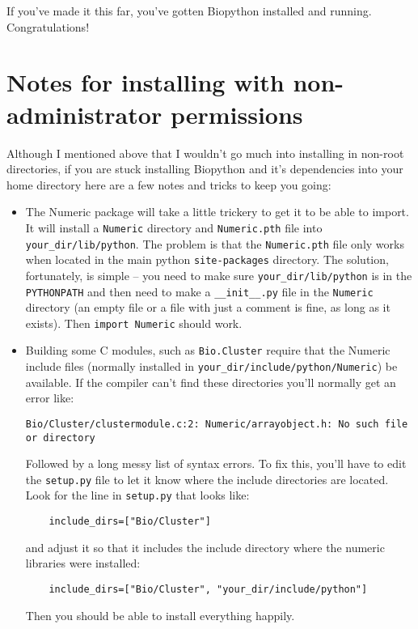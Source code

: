\documentclass{article}
\begin{document}
If you've made it this far, you've gotten Biopython installed and running.
Congratulations!

\section{Notes for installing with non-administrator permissions}

Although I mentioned above that I wouldn't go much into installing in
non-root directories, if you are stuck installing
Biopython and it's dependencies into your home directory here are a
few notes and tricks to keep you going:

\begin{itemize}
  \item The Numeric package will take a little trickery to get it to be
    able to import. It will install a \verb|Numeric| directory and
    \verb|Numeric.pth| file into \verb|your_dir/lib/python|. The problem
    is that the \verb|Numeric.pth| file only works when located in the main
    python \verb|site-packages| directory. The solution, fortunately, is
    simple -- you need to make sure \verb|your_dir/lib/python| is in the
    \verb|PYTHONPATH| and then need to make a \verb|__init__.py| file in
    the \verb|Numeric| directory (an empty file or a file with just a
    comment is fine, as long as it exists). Then \verb|import Numeric|
    should work.

  \item Building some C modules, such as \verb|Bio.Cluster| require that 
    the Numeric include files (normally installed in
    \verb|your_dir/include/python/Numeric|) be available. If the
    compiler can't find these directories you'll normally get an error
    like:

    \begin{verbatim}
Bio/Cluster/clustermodule.c:2: Numeric/arrayobject.h: No such file or directory
    \end{verbatim}

    Followed by a long messy list of syntax errors. To fix this, you'll
    have to edit the \verb|setup.py| file to let it know where the
    include directories are located. Look for the line in
    \verb|setup.py| that looks like:

    \begin{verbatim}
    include_dirs=["Bio/Cluster"]
    \end{verbatim}

    and adjust it so that it includes the include directory where the
    numeric libraries were installed:
    
    \begin{verbatim}
    include_dirs=["Bio/Cluster", "your_dir/include/python"]
    \end{verbatim}

    Then you should be able to install everything happily.

\end{itemize}
\end{document}
